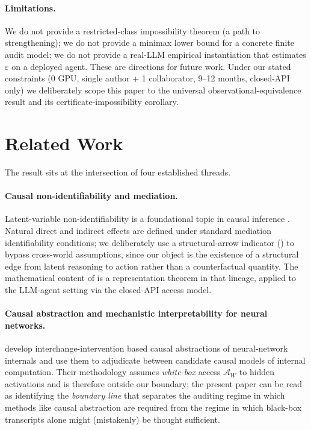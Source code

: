 \documentclass{article}
\theoremstyle{plain}
\theoremstyle{definition}
\theoremstyle{remark}
\begin{document}
\paragraph{Limitations.}
We do not provide a restricted-class impossibility theorem (a path to
strengthening); we do not provide a minimax lower bound for a concrete finite
audit model; we do not provide a real-LLM empirical instantiation that
estimates $\varepsilon$ on a deployed agent. These are directions for future
work. Under our stated constraints (0 GPU, single author + 1 collaborator,
9--12 months, closed-API only) we deliberately scope this paper to the
universal observational-equivalence result and its certificate-impossibility
corollary.

\section{Related Work}\label{sec:relwork}

The result sits at the intersection of four established threads.

\paragraph{Causal non-identifiability and mediation.}
Latent-variable non-identifiability is a foundational topic in causal
inference \citep{pearl2009}. Natural direct and indirect effects
\citep{pearl2001direct} are defined under standard mediation identifiability
conditions; we deliberately use a structural-arrow indicator
() to bypass cross-world assumptions, since our object is the
existence of a structural edge from latent reasoning to action rather than
a counterfactual quantity. The mathematical content of
 is a representation theorem in that lineage,
applied to the LLM-agent setting via the closed-API access model.

\paragraph{Causal abstraction and mechanistic interpretability for neural
networks.}
\citet{geiger2022inducing,geiger2023causal} develop interchange-intervention
based causal abstractions of neural-network internals and use them to
adjudicate between candidate causal models of internal computation. Their
methodology assumes \emph{white-box} access $\mathcal{A}_W$ to hidden
activations and is therefore outside our boundary; the present paper can be
read as identifying the \emph{boundary line} that separates the auditing
regime in which methods like causal abstraction are required from the regime
in which black-box transcripts alone might (mistakenly) be thought
sufficient.
\end{document}
